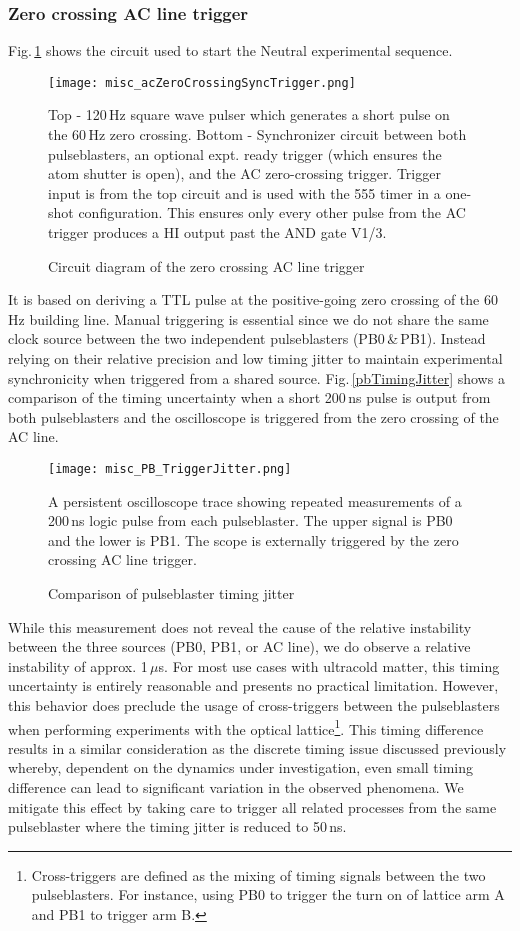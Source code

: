 \subsubsection{Zero crossing AC line trigger} \label{sec:expTrig}
Fig.\,\ref{fig:zeroCrossTrig} shows the circuit used to start the Neutral experimental sequence.
	\begin{figure}
		\centerline{
		\texttt{[image: misc\_acZeroCrossingSyncTrigger.png]}}
		\caption{Circuit diagram of the zero crossing AC line trigger}{Top - 120\,Hz square wave pulser which generates a short pulse on the 60\,Hz zero crossing. Bottom - Synchronizer circuit between both pulseblasters, an optional expt. ready trigger (which ensures the atom shutter is open), and the AC zero-crossing trigger. Trigger input is from the top circuit and is used with the 555 timer in a one-shot configuration. This ensures only every other pulse from the AC trigger produces a HI output past the AND gate V1/3.}
		\label{fig:zeroCrossTrig}
	\end{figure} 
It is based on deriving a TTL pulse at the positive-going zero crossing of the 60\,Hz building line.
Manual triggering is essential since we do not share the same clock source between the two independent pulseblasters (PB0\,\&\,PB1).
Instead relying on their relative precision and low timing jitter to maintain experimental synchronicity when triggered from a shared source.
Fig.\,\ref{pbTimingJitter} shows a comparison of the timing uncertainty when a short 200\,ns pulse is output from both pulseblasters and the oscilloscope is triggered from the zero crossing of the AC line.
	\begin{figure}
		\centerline{
		\texttt{[image: misc\_PB\_TriggerJitter.png]}}
		\caption{Comparison of pulseblaster timing jitter}{A persistent oscilloscope trace showing repeated measurements of a 200\,ns logic pulse from each pulseblaster. The upper signal is PB0 and the lower is PB1. The scope is externally triggered by the zero crossing AC line trigger.}
		\label{fig:pbTimingJitter}
	\end{figure} 
While this measurement does not reveal the cause of the relative instability between the three sources (PB0, PB1, or AC line), we do observe a relative instability of approx. 1\,$\mu$s.
For most use cases with ultracold matter, this timing uncertainty is entirely reasonable and presents no practical limitation.
However, this behavior does preclude the usage of cross-triggers between the pulseblasters when performing experiments with the optical lattice\footnote{Cross-triggers are defined as the mixing of timing signals between the two pulseblasters.
For instance, using PB0 to trigger the turn on of lattice arm A and PB1 to trigger arm B.}.
This timing difference results in a similar consideration as the discrete timing issue discussed previously whereby, dependent on the dynamics under investigation, even small timing difference can lead to significant variation in the observed phenomena.
We mitigate this effect by taking care to trigger all related processes from the same pulseblaster where the timing jitter is reduced to 50\,ns.

